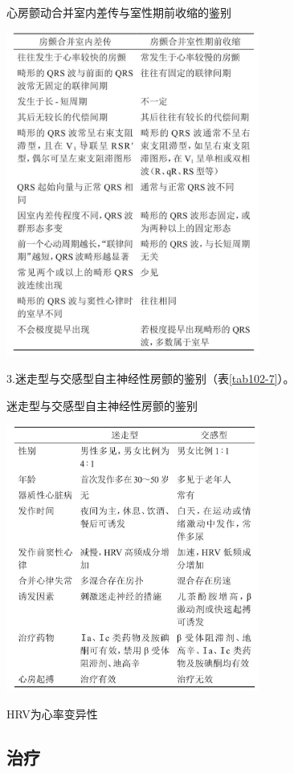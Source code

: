 \begin{table}[htbp]
\centering
\caption{心房颤动合并室内差传与室性期前收缩的鉴别}
\label{tab102-6}
\includegraphics[width=3.27083in,height=4.20833in]{./images/Image00427.jpg}
\end{table}

3.迷走型与交感型自主神经性房颤的鉴别（表\ref{tab102-7}）。

\begin{table}[htbp]
\centering
\caption{迷走型与交感型自主神经性房颤的鉴别}
\label{tab102-7}
\includegraphics[width=3.26042in,height=3.45833in]{./images/Image00428.jpg}
\end{table}

HRV为心率变异性

\subsection{治疗}

